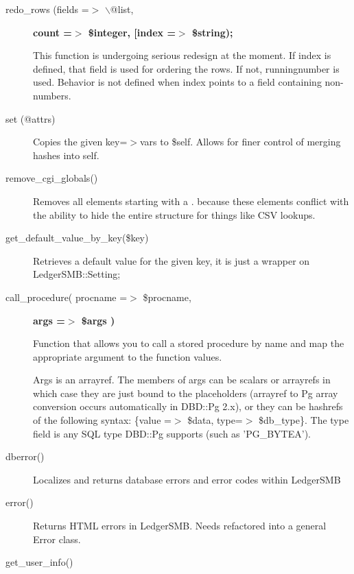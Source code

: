 \begin{description}
\item[{redo\_rows (fields =$>$ $\backslash$@list,}] \textbf{count =$>$ \$integer, [index =$>$ \$string);}

This function is undergoing serious redesign at the moment.  If index is 
defined, that field is used for ordering the rows.  If not, runningnumber is 
used.  Behavior is not defined when index points to a field containing 
non-numbers.


\item[{set (@attrs)}] \mbox{}

Copies the given key=$>$vars to \$self. Allows for finer control of 
merging hashes into self.


\item[{remove\_cgi\_globals()}] \mbox{}

Removes all elements starting with a . because these elements conflict with the
ability to hide the entire structure for things like CSV lookups.


\item[{get\_default\_value\_by\_key(\$key)}] \mbox{}

Retrieves a default value for the given key, it is just a wrapper on LedgerSMB::Setting;


\item[{call\_procedure( procname =$>$ \$procname,}] \textbf{args =$>$ \$args )}

Function that allows you to call a stored procedure by name and map the appropriate argument to the function values.



Args is an arrayref.  The members of args can be scalars or arrayrefs in which 
case they are just bound to the placeholders (arrayref to Pg array conversion
occurs automatically in DBD::Pg 2.x), or they can be hashrefs of the following
syntax: \{value =$>$ \$data, type=$>$ \$db\_type\}.  The type field is any SQL type 
DBD::Pg supports (such as 'PG\_BYTEA').


\item[{dberror()}] \mbox{}

Localizes and returns database errors and error codes within LedgerSMB


\item[{error()}] \mbox{}

Returns HTML errors in LedgerSMB. Needs refactored into a general Error class.


\item[{get\_user\_info()}] \mbox{}


\end{description}
